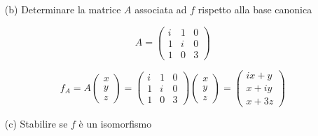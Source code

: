 \documentclass[a4paper]{article}
\theoremstyle{break}
\theoremstyle{break}
\theoremstyle{break}
\theoremstyle{break}
\begin{document}
\begin{enumerate}
	\item[(b)] Determinare la matrice \( A \) associata ad \( f \) rispetto alla base canonica

	      \vspace{1em}
	      \[
		      A = \begin{pmatrix}
			      i & 1 & 0 \\
			      1 & i & 0 \\
			      1 & 0 & 3
		      \end{pmatrix}
	      \]

	      \[
		      f_A = A \begin{pmatrix}
			      x \\
			      y \\
			      z
		      \end{pmatrix}
		      =
		      \begin{pmatrix}
			      i & 1 & 0 \\
			      1 & i & 0 \\
			      1 & 0 & 3
		      \end{pmatrix}
		      \begin{pmatrix}
			      x \\
			      y \\
			      z
		      \end{pmatrix}
		      =
		      \begin{pmatrix}
			      ix + y \\
			      x + iy \\
			      x + 3z
		      \end{pmatrix}
	      \]

	\item[(c)] Stabilire se \( f \) è un isomorfismo


\end{enumerate}
\end{document}
